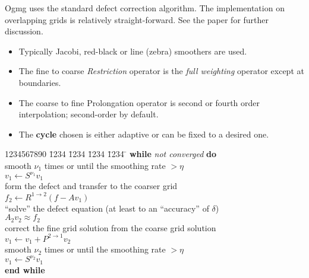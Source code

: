 \documentclass{article}
\begin{document}
Ogmg uses the standard defect correction algorithm. The implementation
on overlapping grids is relatively straight-forward. See the paper \cite{CGMG}
for further discussion.

\begin{itemize}
\item Typically Jacobi, red-black or line (zebra) smoothers are used.

\item The fine to coarse {\sl Restriction} operator is the {\it full weighting}
operator except at boundaries.

\item The coarse to fine Prolongation operator is second or fourth
order interpolation; second-order by default.

\item The {\bf cycle} chosen is either adaptive or can be fixed
to a desired one.
\end{itemize}


\begin{tabbing}
1234567890 \= 1234 \= 1234 \= 1234 \= 1234 \=  \kill  %
\> {\bf while} {\it not converged} {\bf do}                   \\
\>\>  smooth $\nu_1$ times or until the smoothing rate $> \eta$      \\
\>\>\>  $v_1 \gets S^{\nu_1} v_1$                                    \\
\>\>    form the defect and transfer to the coarser grid             \\
\>\>\>  $f_2 \gets R^{1\to2} ( f-A v_1) $                            \\
\>\>  ``solve'' the defect equation (at least to an
                ``accuracy'' of $\delta$) \\
\>\>\>    $A_2 v_2 \approx f_2$                                      \\
\>\>    correct the fine grid solution from the coarse grid solution \\
\>\>\>  $v_1 \gets v_1 + P^{2\to1} v_2 $                             \\
\>\>  smooth $\nu_2$ times or until the smoothing rate $> \eta$      \\
\>\>\>  $v_1 \gets S^{\nu_2} v_1$                                    \\
\> {\bf end while}
\end{tabbing}
\end{document}
